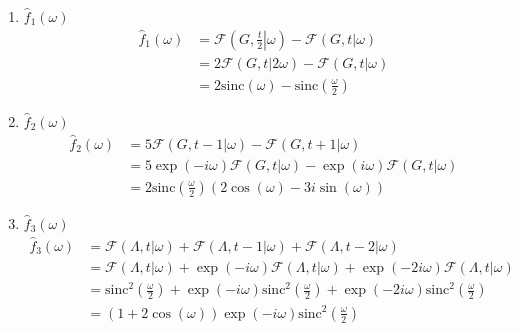 \documentclass[a4paper,12pt,final]{article}
\begin{document}
      \begin{enumerate}[label=\alph*)]
        \item $\widehat{f}_{1}\left(\omega\right)$
          \begin{equation*}
            \begin{split}
              \widehat{f}_{1}\left(\omega\right) & = \mathcal{F}\left(G,\left.\frac{t}{2}\right|\omega\right) - \mathcal{F}\left(G,t|\omega\right) \\
                                                 & = 2\mathcal{F}\left(G,t|2\omega\right) - \mathcal{F}\left(G,t|\omega\right) \\
                                                 & = 2\mathrm{sinc}\left(\omega\right) - \mathrm{sinc}\left(\frac{\omega}{2}\right)
            \end{split}
          \end{equation*}

        \item $\widehat{f}_{2}\left(\omega\right)$
          \begin{equation*}
            \begin{split}
              \widehat{f}_{2}\left(\omega\right) & = 5\mathcal{F}\left(G,t-1|\omega\right) - \mathcal{F}\left(G,t+1|\omega\right) \\
                                                 & = 5\exp\left(-i \omega\right)\mathcal{F}\left(G,t|\omega\right) - \exp\left(i \omega\right)\mathcal{F}\left(G,t|\omega\right) \\
                                                 & = 2\mathrm{sinc}\left(\frac{\omega}{2}\right)\left(2\cos\left(\omega\right) - 3i\sin\left(\omega\right) \right)
            \end{split}
          \end{equation*}

        \item $\widehat{f}_{3}\left(\omega\right)$
          \begin{equation*}
            \begin{split}
              \widehat{f}_{3}\left(\omega\right) & = \mathcal{F}\left(\Lambda,t|\omega\right) + \mathcal{F}\left(\Lambda,t-1|\omega\right) + \mathcal{F}\left(\Lambda,t-2|\omega\right) \\
                                                 & = \mathcal{F}\left(\Lambda,t|\omega\right) + \exp\left(- i \omega\right) \mathcal{F}\left(\Lambda,t|\omega\right) + \exp\left(- 2 i \omega\right) \mathcal{F}\left(\Lambda,t|\omega\right) \\
                                                 & = \mathrm{sinc}^{2}\left(\frac{\omega}{2}\right) + \exp\left(- i \omega\right) \mathrm{sinc}^{2}\left(\frac{\omega}{2}\right) + \exp\left(- 2 i \omega\right) \mathrm{sinc}^{2}\left(\frac{\omega}{2}\right) \\
                                                 & = \left(1 + 2 \cos\left(\omega\right) \right)\exp\left(- i \omega\right)\mathrm{sinc}^{2}\left(\frac{\omega}{2}\right)
            \end{split}
          \end{equation*}


\end{enumerate}
\end{document}
